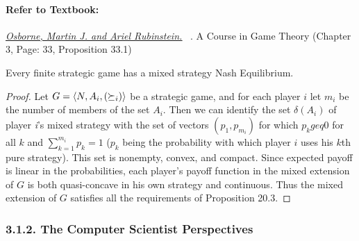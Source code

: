 \documentclass[runningheads]{llncs}
\begin{document}
\paragraph{Refer to Textbook:} 
\href{https://www.sciencedirect.com/science/article/pii/S0899825699907236}{\textit{\underline{Osborne, Martin J. and Ariel Rubinstein.}}}~
\citeyear{osborne1994course}. A Course in Game Theory (Chapter 3, Page: 33, Proposition 33.1)
\begin{proposition}
Every finite strategic game has a mixed strategy Nash Equilibrium.
\end{proposition}
\begin{proof}
Let $G=\langle\mathnormal{N}, \mathnormal{A_{i}},(\succeq_{i})\rangle$ be a strategic game, and for each player $i$ let $m_{i}$ be the number of members of the set $A_{i}$. Then we can identify the set $\delta(A_{i})$ of player \textit{i}'s mixed strategy with the set of vectors $(p_{1},p_{m_{i}})$ for which $p_{k} geq 0 $ for all $k$ and $\sum_{k=1}^{m_i}p_{k}=1$ ($p_{k}$ being the probability with which player $i$ uses his $k$th pure strategy). This set is nonempty, convex, and compact. Since expected payoff is linear in the probabilities, each player's payoff function in the mixed extension of $G$ is both quasi-concave in his own strategy and continuous. Thus the mixed extension of $G$ satisfies all the requirements of Proposition 20.3.
 \end{proof}


\subsubsection{3.1.2. The Computer Scientist Perspectives}
\end{document}
